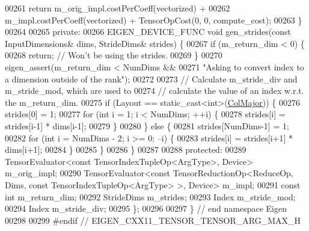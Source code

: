 \begin{DoxyCode}
00261     \textcolor{keywordflow}{return} m\_orig\_impl.costPerCoeff(vectorized) +
00262            m\_impl.costPerCoeff(vectorized) + TensorOpCost(0, 0, compute\_cost);
00263   \}
00264 
00265  \textcolor{keyword}{private}:
00266   EIGEN\_DEVICE\_FUNC \textcolor{keywordtype}{void} gen\_strides(\textcolor{keyword}{const} InputDimensions& dims, StrideDims& strides) \{
00267     \textcolor{keywordflow}{if} (m\_return\_dim < 0) \{
00268       \textcolor{keywordflow}{return};  \textcolor{comment}{// Won't be using the strides.}
00269     \}
00270     eigen\_assert(m\_return\_dim < NumDims &&
00271                  \textcolor{stringliteral}{"Asking to convert index to a dimension outside of the rank"});
00272 
00273     \textcolor{comment}{// Calculate m\_stride\_div and m\_stride\_mod, which are used to}
00274     \textcolor{comment}{// calculate the value of an index w.r.t. the m\_return\_dim.}
00275     \textcolor{keywordflow}{if} (Layout == static\_cast<int>(\hyperlink{group__enums_ggaacded1a18ae58b0f554751f6cdf9eb13a0cbd4bdd0abcfc0224c5fcb5e4f6669a}{ColMajor})) \{
00276       strides[0] = 1;
00277       \textcolor{keywordflow}{for} (\textcolor{keywordtype}{int} i = 1; i < NumDims; ++i) \{
00278         strides[i] = strides[i-1] * dims[i-1];
00279       \}
00280     \} \textcolor{keywordflow}{else} \{
00281       strides[NumDims-1] = 1;
00282       \textcolor{keywordflow}{for} (\textcolor{keywordtype}{int} i = NumDims - 2; i >= 0; --i) \{
00283         strides[i] = strides[i+1] * dims[i+1];
00284       \}
00285     \}
00286   \}
00287 
00288  \textcolor{keyword}{protected}:
00289   TensorEvaluator<const TensorIndexTupleOp<ArgType>, Device> m\_orig\_impl;
00290   TensorEvaluator<const TensorReductionOp<ReduceOp, Dims, const TensorIndexTupleOp<ArgType> >, Device> 
      m\_impl;
00291   \textcolor{keyword}{const} \textcolor{keywordtype}{int} m\_return\_dim;
00292   StrideDims m\_strides;
00293   Index m\_stride\_mod;
00294   Index m\_stride\_div;
00295 \};
00296 
00297 \} \textcolor{comment}{// end namespace Eigen}
00298 
00299 \textcolor{preprocessor}{#endif // EIGEN\_CXX11\_TENSOR\_TENSOR\_ARG\_MAX\_H}
\end{DoxyCode}
